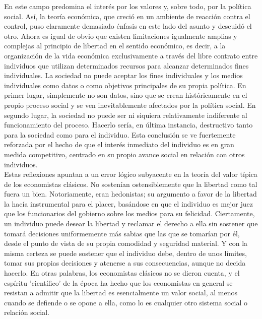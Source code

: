 En este campo predomina el interés por los valores y, sobre todo, por la política social. Así, la teoría económica, que creció en un ambiente de reacción contra el control, puso claramente demasiado énfasis en este lado del asunto y descuidó el otro. Ahora es igual de obvio que existen limitaciones igualmente amplias y complejas al principio de libertad en el sentido económico, es decir, a la organización de la vida económica exclusivamente a través del libre contrato entre individuos que utilizan determinados recursos para alcanzar determinados fines individuales. La sociedad no puede aceptar los fines individuales y los medios individuales como datos o como objetivos principales de su propia política. En primer lugar, simplemente no son datos, sino que se crean históricamente en el propio proceso social y se ven inevitablemente afectados por la política social. En segundo lugar, la sociedad no puede ser ni siquiera relativamente indiferente al funcionamiento del proceso. Hacerlo sería, en última instancia, destructivo tanto para la sociedad como para el individuo. Esta conclusión se ve fuertemente reforzada por el hecho de que el interés inmediato del individuo es en gran medida competitivo, centrado en su propio avance social en relación con otros individuos.\\

Estas reflexiones apuntan a un error lógico subyacente en la teoría del valor típica de los economistas clásicos.  No sostenían ostensiblemente que la libertad como tal fuera un bien. Notoriamente, eran hedonistas; su argumento a favor de la libertad la hacía instrumental para el placer, basándose en que el individuo es mejor juez que los funcionarios del gobierno sobre los medios para su felicidad. Ciertamente, un individuo puede desear la libertad y reclamar el derecho a ella sin sostener que tomará decisiones uniformemente más sabias que las que se tomarían por él, desde el punto de vista de su propia comodidad y seguridad material. Y con la misma certeza se puede sostener que el individuo debe, dentro de unos límites, tomar sus propias decisiones y atenerse a sus consecuencias, aunque no decida hacerlo. En otras palabras, los economistas clásicos no se dieron cuenta, y el espíritu 'científico' de la época ha hecho que los economistas en general se resistan a admitir que la libertad es esencialmente un valor social, al menos cuando se defiende o se opone a ella, como lo es cualquier otro sistema social o relación social.\\

